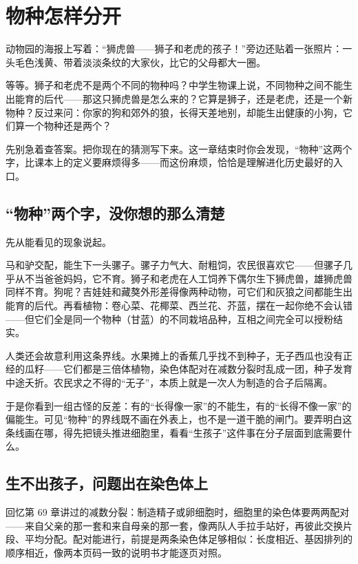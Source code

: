 \chapter{物种怎样分开}

\begin{kaichang}
动物园的海报上写着：“狮虎兽——狮子和老虎的孩子！”旁边还贴着一张照片：一头毛色浅黄、带着淡淡条纹的大家伙，比它的父母都大一圈。

等等。狮子和老虎不是两个不同的物种吗？中学生物课上说，不同物种之间不能生出能育的后代——那这只狮虎兽是怎么来的？它算是狮子，还是老虎，还是一个新物种？反过来问：你家的狗和郊外的狼，长得天差地别，却能生出健康的小狗，它们算一个物种还是两个？

先别急着查答案。把你现在的猜测写下来。这一章结束时你会发现，“物种”这两个字，比课本上的定义要麻烦得多——而这份麻烦，恰恰是理解进化历史最好的入口。
\end{kaichang}

\section{“物种”两个字，没你想的那么清楚}

先从能看见的现象说起。

马和驴交配，能生下一头骡子。骡子力气大、耐粗饲，农民很喜欢它——但骡子几乎从不当爸爸妈妈，它不育。狮子和老虎在人工饲养下偶尔生下狮虎兽，雄狮虎兽同样不育。狗呢？吉娃娃和藏獒外形差得像两种动物，可它们和灰狼之间都能生出能育的后代。再看植物：卷心菜、花椰菜、西兰花、芥蓝，摆在一起你绝不会认错——但它们全是同一个物种（甘蓝）的不同栽培品种，互相之间完全可以授粉结实。

人类还会故意利用这条界线。水果摊上的香蕉几乎找不到种子，无子西瓜也没有正经的瓜籽——它们都是三倍体植物，染色体配对在减数分裂时乱成一团，种子发育中途夭折。农民求之不得的“无子”，本质上就是一次人为制造的合子后隔离。

于是你看到一组古怪的反差：有的“长得像一家”的不能生，有的“长得不像一家”的偏能生。可见“物种”的界线既不画在外表上，也不是一道干脆的闸门。要弄明白这条线画在哪，得先把镜头推进细胞里，看看“生孩子”这件事在分子层面到底需要什么。

\section{生不出孩子，问题出在染色体上}

回忆第 69 章讲过的减数分裂：制造精子或卵细胞时，细胞里的染色体要两两配对——来自父亲的那一套和来自母亲的那一套，像两队人手拉手站好，再彼此交换片段、平均分配。配对能进行，前提是两条染色体足够相似：长度相近、基因排列的顺序相近，像两本页码一致的说明书才能逐页对照。

